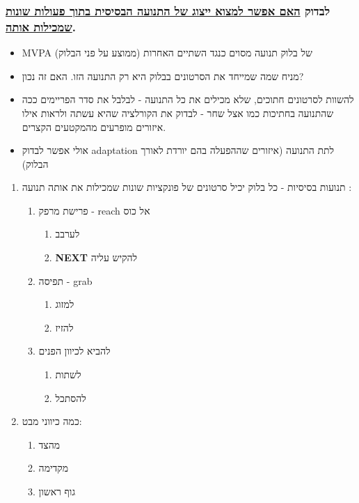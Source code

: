 \documentclass[11pt]{article}
\begin{document}
\subsubsection{לבדוק \underline{האם אפשר למצוא ייצוג של התנועה הבסיסית בתוך פעולות שונות שמכילות אותה}.}
\label{sec:org3abb925}
\begin{itemize}
\item ‏MVPA של בלוק תנועה מסוים כנגד השתיים האחרות (ממוצע על פני הבלוק)
\item מניח שמה שמייחד את הסרטונים בבלוק היא רק התנועה הזו. האם זה נכון?
\item להשוות לסרטונים חתוכים, שלא מכילים את כל התנועה - לבלבל את סדר הפריימים ככה שהתנועה בחתיכות כמו אצל שחר - לבדוק את הקורלציה שהיא עשתה ולראות אילו איזורים מופרעים מהמקטעים הקצרים.
\item אולי אפשר לבדוק adaptation לתת התנועה (איזורים שההפעלה בהם יורדת לאורך הבלוק)
\end{itemize}
\begin{enumerate}
\item תנועות בסיסיות - כל בלוק יכיל סרטונים של פונקציות שונות שמכילות את אותה תנועה :
\label{sec:org0b2b234}
\begin{enumerate}
\item פרישת מרפק - reach אל כוס
\label{sec:org865c1d0}
\begin{enumerate}
\item לערבב
\label{sec:org289db64}
\item {\bfseries\sffamily NEXT} להקיש עליה
\label{sec:org74fa134}
\end{enumerate}
\item תפיסה - grab
\label{sec:orgd19b28a}
\begin{enumerate}
\item למזוג
\label{sec:orgb62ebb9}
\item להזיז
\label{sec:orgd96e205}
\end{enumerate}
\item להביא לכיוון הפנים
\label{sec:orgf0fe82e}
\begin{enumerate}
\item לשתות
\label{sec:orgcf5e017}
\item להסתכל
\label{sec:org615f792}
\end{enumerate}
\end{enumerate}
\item כמה כיווני מבט:
\label{sec:org5280e65}
\begin{enumerate}
\item מהצד
\label{sec:orgdbb707c}
\item מקדימה
\label{sec:org85f7f3a}
\item גוף ראשון
\label{sec:org3142bbb}
\end{enumerate}
\end{enumerate}
\end{document}
